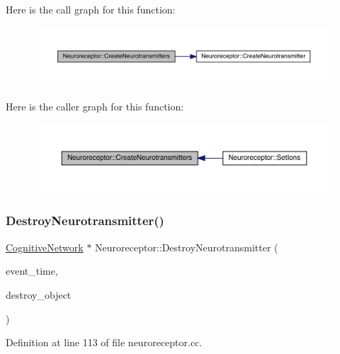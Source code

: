 Here is the call graph for this function\+:\nopagebreak
\begin{figure}[H]
\begin{center}
\leavevmode
\includegraphics[width=350pt]{class_neuroreceptor_aa0037379ecb214ff982429e054f2a194_cgraph}
\end{center}
\end{figure}
Here is the caller graph for this function\+:\nopagebreak
\begin{figure}[H]
\begin{center}
\leavevmode
\includegraphics[width=350pt]{class_neuroreceptor_aa0037379ecb214ff982429e054f2a194_icgraph}
\end{center}
\end{figure}
\mbox{\label{class_neuroreceptor_a35beb8e355f9b567b327e9323f5552a0}} 
\subsubsection{\texorpdfstring{Destroy\+Neurotransmitter()}{DestroyNeurotransmitter()}}
{\footnotesize\ttfamily \hyperlink{class_cognitive_network}{Cognitive\+Network} $\ast$ Neuroreceptor\+::\+Destroy\+Neurotransmitter (\begin{DoxyParamCaption}\item[{std\+::chrono\+::time\+\_\+point$<$ \hyperlink{universe_8h_a0ef8d951d1ca5ab3cfaf7ab4c7a6fd80}{Clock} $>$}]{event\+\_\+time,  }\item[{\hyperlink{class_cognitive_network}{Cognitive\+Network} $\ast$}]{destroy\+\_\+object }\end{DoxyParamCaption})}



Definition at line 113 of file neuroreceptor.\+cc.

